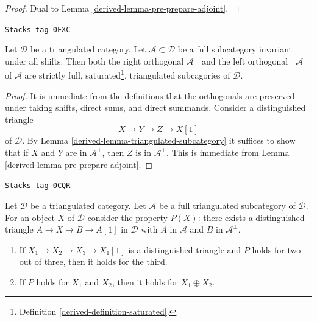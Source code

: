 \begin{proof}

Dual to Lemma \ref{derived-lemma-pre-prepare-adjoint}.
\end{proof}

\begin{lemma}
\label{derived-lemma-orthogonal-triangulated}
\href{https://stacks.math.columbia.edu/tag/0FXC}{\texttt{Stacks tag 0FXC}}

Let $\mathcal{D}$ be a triangulated category. Let
$\mathcal{A} \subset \mathcal{D}$ be a full subcategory invariant
under all shifts. Then both the right orthogonal $\mathcal{A}^\perp$ and
the left orthogonal ${}^\perp\mathcal{A}$ of $\mathcal{A}$
are strictly full, saturated\footnote{Definition \ref{derived-definition-saturated}.},
triangulated subcagories of $\mathcal{D}$.
\end{lemma}

\begin{proof}

It is immediate from the definitions that the orthogonals are preserved
under taking shifts, direct sums, and direct summands.
Consider a distinguished triangle
$$
X \to Y \to Z \to X[1]
$$
of $\mathcal{D}$. By Lemma \ref{derived-lemma-triangulated-subcategory} it
suffices to show that if $X$ and $Y$ are in $\mathcal{A}^\perp$, then
$Z$ is in $\mathcal{A}^\perp$. This is immediate from
Lemma \ref{derived-lemma-pre-prepare-adjoint}.
\end{proof}

\begin{lemma}
\label{derived-lemma-prepare-adjoint}
\href{https://stacks.math.columbia.edu/tag/0CQR}{\texttt{Stacks tag 0CQR}}

Let $\mathcal{D}$ be a triangulated category. Let $\mathcal{A}$
be a full triangulated subcategory of $\mathcal{D}$. For an object $X$
of $\mathcal{D}$ consider the property $P(X)$: there exists a
distinguished triangle $A \to X \to B \to A[1]$
in $\mathcal{D}$ with $A$ in $\mathcal{A}$ and $B$ in $\mathcal{A}^\perp$.
\begin{enumerate}
\item If $X_1 \to X_2 \to X_3 \to X_1[1]$ is a distinguished triangle
and $P$ holds for two out of three, then it holds for the third.
\item If $P$ holds for $X_1$ and $X_2$, then it holds for $X_1 \oplus X_2$.
\end{enumerate}
\end{lemma}

